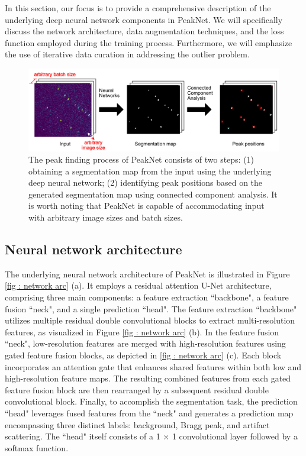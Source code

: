 \documentclass[a4paper]{article}
\newcommand{\peaknet}{PeakNet}
\begin{document}
In this section, our focus is to provide a comprehensive description of the underlying deep neural network components in \peaknet{}.  We will specifically discuss the network architecture, data augmentation techniques, and the loss function employed during the training process.  Furthermore, we will emphasize the use of iterative data curation in addressing the outlier problem.

\begin{figure}[!ht]
\includegraphics[width=\textwidth,keepaspectratio]
{./figures/peaknet_steps.pdf}
\caption{The peak finding process of \peaknet{} consists of two steps: (1)
obtaining a segmentation map from the input using the underlying deep neural
network; (2) identifying peak positions based on the generated segmentation map
using connected component analysis.  It is worth noting that \peaknet{} is
capable of accommodating input with arbitrary image sizes and batch sizes.  }
\label{fig : peak finding}
\end{figure}


\subsection{Neural network architecture}

The underlying neural network architecture of \peaknet{} is illustrated in Figure \ref{fig : network arc} (a).  It employs a residual attention U-Net architecture, comprising three main components: a feature extraction ``backbone", a feature fusion ``neck", and a single prediction ``head".  The feature extraction ``backbone" utilizes multiple residual double convolutional blocks to extract multi-resolution features, as visualized in Figure \ref{fig : network arc} (b).  In the feature fusion ``neck", low-resolution features are merged with high-resolution features using gated feature fusion blocks, as depicted in \ref{fig : network arc} (c).  Each block incorporates an attention gate that enhances shared features within both low and high-resolution feature maps.  The resulting combined features from each gated feature fusion block are then rearranged by a subsequent residual double convolutional block.  Finally, to accomplish the segmentation task, the prediction ``head" leverages fused features from the ``neck" and generates a prediction map encompassing three distinct labels: background, Bragg peak, and artifact scattering.  The ``head" itself consists of a 1 $\times$ 1 convolutional layer followed by a softmax function.
\end{document}
